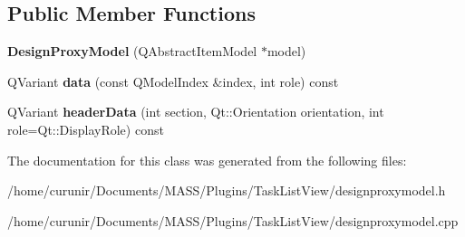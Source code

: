 \subsection*{Public Member Functions}
\begin{DoxyCompactItemize}
\item 
{\bfseries Design\+Proxy\+Model} (Q\+Abstract\+Item\+Model $\ast$model)\hypertarget{class_design_proxy_model_a2f32a37a9e0e12091ffa25d12c2cf172}{}\label{class_design_proxy_model_a2f32a37a9e0e12091ffa25d12c2cf172}

\item 
Q\+Variant {\bfseries data} (const Q\+Model\+Index \&index, int role) const \hypertarget{class_design_proxy_model_ab6b5a21836be24039e4d14ef1253f38f}{}\label{class_design_proxy_model_ab6b5a21836be24039e4d14ef1253f38f}

\item 
Q\+Variant {\bfseries header\+Data} (int section, Qt\+::\+Orientation orientation, int role=Qt\+::\+Display\+Role) const \hypertarget{class_design_proxy_model_a8f9dcafcd1c0bdfcb36f35282cca2abb}{}\label{class_design_proxy_model_a8f9dcafcd1c0bdfcb36f35282cca2abb}

\end{DoxyCompactItemize}


The documentation for this class was generated from the following files\+:\begin{DoxyCompactItemize}
\item 
/home/curunir/\+Documents/\+M\+A\+S\+S/\+Plugins/\+Task\+List\+View/designproxymodel.\+h\item 
/home/curunir/\+Documents/\+M\+A\+S\+S/\+Plugins/\+Task\+List\+View/designproxymodel.\+cpp\end{DoxyCompactItemize}
